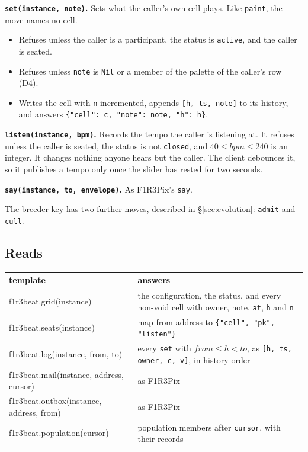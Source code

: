 \documentclass[11pt,a4paper]{article}
\newcommand{\code}[1]{\texttt{#1}}
\begin{document}
\textbf{\code{set(instance, note)}.} Sets what the caller's own cell plays. Like
\code{paint}, the move names no cell.
\begin{itemize}[leftmargin=1.2em,itemsep=1pt]
\item Refuses unless the caller is a participant, the status is \code{active}, and the caller
  is seated.
\item Refuses unless \code{note} is \code{Nil} or a member of the palette of the caller's row
  (D4).
\item Writes the cell with \code{n} incremented, appends \code{[h, ts, note]} to its history,
  and answers \code{\{"cell": c, "note": note, "h": h\}}.
\end{itemize}

\textbf{\code{listen(instance, bpm)}.} Records the tempo the caller is listening at. It refuses
unless the caller is seated, the status is not \code{closed}, and $40\le\mathit{bpm}\le 240$ is
an integer. It changes nothing anyone hears but the caller. The client debounces it, so it
publishes a tempo only once the slider has rested for two seconds.

\textbf{\code{say(instance, to, envelope)}.} As F1R3Pix's \code{say}.

The breeder key has two further moves, described in \S\ref{sec:evolution}: \code{admit} and
\code{cull}.

\subsection{Reads}

\begin{center}\small
\begin{tabularx}{\linewidth}{@{}>{\ttfamily}l X@{}}
\toprule
\normalfont template & answers\\
\midrule
f1r3beat.grid(instance)     & the configuration, the status, and every non-void cell with owner, note, \code{at}, \code{h} and \code{n}\\
f1r3beat.seats(instance)    & map from address to \code{\{"cell", "pk", "listen"\}}\\
f1r3beat.log(instance, from, to) & every \code{set} with $\mathit{from}\le h<\mathit{to}$, as \code{[h, ts, owner, c, v]}, in history order\\
f1r3beat.mail(instance, address, cursor) & as F1R3Pix\\
f1r3beat.outbox(instance, address, from) & as F1R3Pix\\
f1r3beat.population(cursor) & population members after \code{cursor}, with their records\\
\bottomrule
\end{tabularx}
\end{center}
\end{document}
